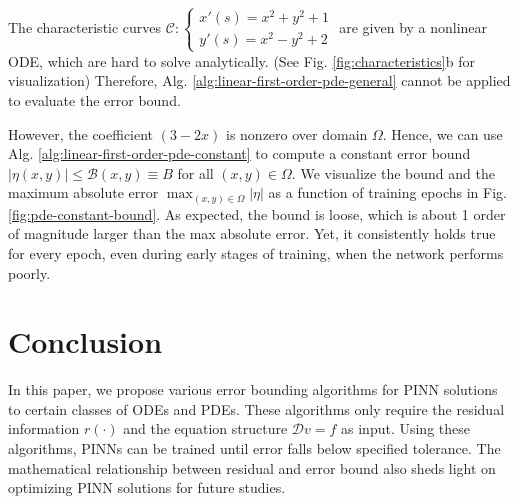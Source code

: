 \documentclass[accepted]{uai2023}
\newcommand{\Err}{\eta}
\newcommand{\Bound}{\mathcal{B}}
\begin{document}
    The characteristic curves {\small $\mathcal{C}: \begin{cases*} x'(s) = x^2+y^2+1 \\[-0.25em] y'(s) = x^2 - y^2 + 2 \end{cases*}$} are given by a nonlinear ODE, which are hard to solve analytically. 
    (See Fig. \ref{fig:characteristics}b for visualization)
    Therefore, Alg. \ref{alg:linear-first-order-pde-general} cannot be applied to evaluate the error bound. 

    However, the coefficient $(3-2x)$ is nonzero over domain $\Omega$.
    Hence, we can use Alg. \ref{alg:linear-first-order-pde-constant} to compute a constant error bound $|\eta(x, y)| \leq \Bound(x, y) \equiv B$ for all $(x, y) \in \Omega$.
    We visualize the bound and the maximum absolute error $\max_{(x, y)\in\Omega}|\Err|$ as a function of training epochs in Fig. \ref{fig:pde-constant-bound}.
    As expected, the bound is loose, which is about 1 order of magnitude larger than the max absolute error.
    Yet, it consistently holds true for every epoch, even during early stages of training, when the network performs poorly.

\section{Conclusion}
    In this paper, we propose various error bounding algorithms for PINN solutions to certain classes of ODEs and PDEs. 
    These algorithms only require the residual information $r(\cdot)$ and the equation structure $\mathcal{D} v = f$ as input.
    Using these algorithms, PINNs can be trained until error falls below specified tolerance.
    The mathematical relationship between residual and error bound also sheds light on optimizing PINN solutions for future studies.


\end{document}
